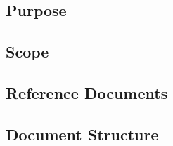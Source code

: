 \subsection{Purpose}
\label{sect:introduction:purpose}


\subsection{Scope}
\label{sect:introduction:scope}


\subsection{Reference Documents}
\label{sect:introduction:refdocs}


\subsection{Document Structure}
\label{sect:introduction:docstructure}

